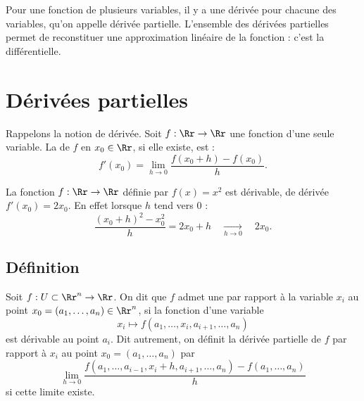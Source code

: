 \documentclass[12pt, class=report,crop=false]{standalone}
\begin{document}

\newcommand{\grad}{\operatorname{grad}} %


Pour une fonction de plusieurs variables,  
il y a une dérivée pour chacune des variables, qu'on appelle dérivée partielle. L'ensemble des dérivées partielles permet de 
reconstituer une approximation linéaire de la fonction : c'est la différentielle.


\section{Dérivées partielles}

Rappelons la notion de dérivée.
Soit $f : \Rr \to \Rr$ une fonction d'une seule variable.
La  de $f$ en $x_0 \in \Rr$, si elle existe, est : 
$$f'(x_0) = \lim_{h \to 0} \frac{f(x_0 + h) - f(x_0)}{h}.$$

\begin{exemple}
La fonction $f : \Rr \to \Rr$ définie par $f(x)=x^2$ est dérivable, de dérivée $f'(x_0)=2x_0$. En effet lorsque $h$ tend vers $0$ :
$$\frac{(x_0+h)^2-x_0^2}{h}=2x_0+h \quad \underset{h\to 0}{\longrightarrow} \quad 2x_0.$$
\end{exemple}


\subsection{Définition}

\begin{definition}
Soit $f : U \subset \Rr^n \to \Rr$. 
On dit que $f$ admet une  par rapport à la variable $x_i$ au point $x_0=(a_1,\dots, a_n) \in \Rr^n$, si la fonction d'une variable
$$x_i \mapsto f(a_1,\dots,x_i, a_{i+1},\ldots,a_n)$$
est dérivable au point $a_i$. Dit autrement, on définit la dérivée partielle de $f$ par rapport à $x_i$ au point $x_0=(a_1,\ldots, a_n)$ par  
$$
\lim_{h \rightarrow 0} 
\frac{f(a_1, \ldots, a_{i-1} , x_i + h, a_{i+1} , \dots , a_n) - f(a_1,\ldots, a_n)}{h}
$$ 
si cette limite existe.
\end{definition}

\bigskip
\end{document}
